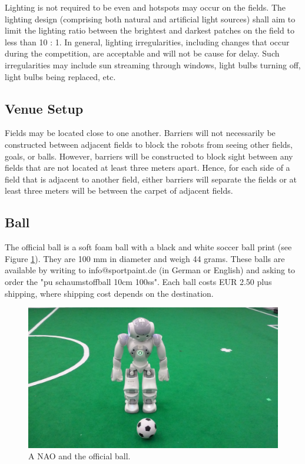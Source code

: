 \documentclass[12pt]{article}
\begin{document}
Lighting is not required to be even and hotspots may occur on the fields. The lighting design (comprising both natural and artificial light sources) shall aim to limit the lighting ratio between the brightest and darkest patches on the field to less than 10 : 1. In general, lighting irregularities, including changes that occur during the competition, are acceptable and will not be cause for delay.  Such irregularities may include sun streaming through windows, light bulbs turning off, light bulbs being replaced, etc.

\subsection{Venue Setup}
\label{sec:boundaries}
Fields may be located close to one another.  Barriers will not necessarily be constructed between adjacent fields to block the robots from seeing other fields, goals, or balls.  However, barriers will be constructed to block sight between any fields that are not located at least three meters apart.  Hence, for each side of a field that is adjacent to another field, either barriers will separate the fields or at least three meters will be between the carpet of adjacent fields.

\subsection{Ball}
\label{sec:ball}

The official ball is a soft foam ball with a black and white soccer ball print (see Figure \ref{fig:ball}). They are 100 mm in diameter and weigh 44 grams. These balls are available by writing to info@sportpaint.de (in German or English) and asking to order the "pu schaumstoffball 10cm 100ss".  Each ball costs EUR 2.50 plus shipping, where shipping cost depends on the destination.

\begin{figure}[t]
  \centerline{\includegraphics[height=0.28\columnwidth]{figs/robotWithBall2016.jpg}}
  \caption{A NAO and the official ball.}
  \label{fig:ball}
\end{figure}
\end{document}
